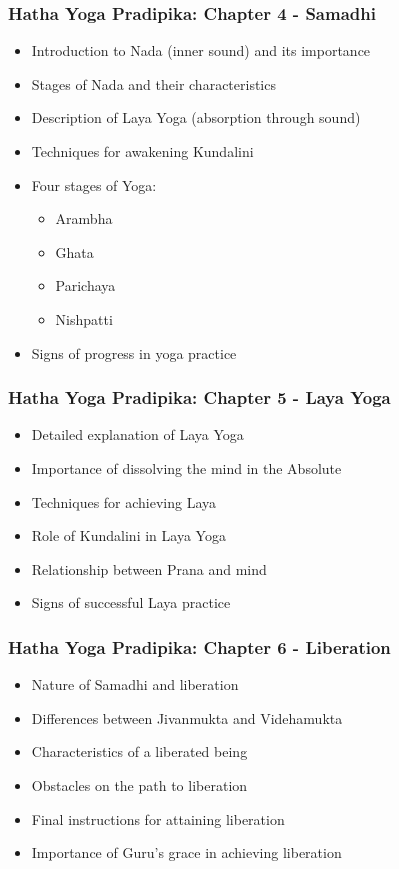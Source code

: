 \begin{frame}[fragile]\frametitle{Hatha Yoga Pradipika: Chapter 4 - Samadhi}
\begin{itemize}
    \item Introduction to Nada (inner sound) and its importance
    \item Stages of Nada and their characteristics
    \item Description of Laya Yoga (absorption through sound)
    \item Techniques for awakening Kundalini
    \item Four stages of Yoga:
    \begin{itemize}
        \item Arambha
        \item Ghata
        \item Parichaya
        \item Nishpatti
    \end{itemize}
    \item Signs of progress in yoga practice
\end{itemize}
\end{frame}

\begin{frame}[fragile]\frametitle{Hatha Yoga Pradipika: Chapter 5 - Laya Yoga}
\begin{itemize}
    \item Detailed explanation of Laya Yoga
    \item Importance of dissolving the mind in the Absolute
    \item Techniques for achieving Laya
    \item Role of Kundalini in Laya Yoga
    \item Relationship between Prana and mind
    \item Signs of successful Laya practice
\end{itemize}
\end{frame}

\begin{frame}[fragile]\frametitle{Hatha Yoga Pradipika: Chapter 6 - Liberation}
\begin{itemize}
    \item Nature of Samadhi and liberation
    \item Differences between Jivanmukta and Videhamukta
    \item Characteristics of a liberated being
    \item Obstacles on the path to liberation
    \item Final instructions for attaining liberation
    \item Importance of Guru's grace in achieving liberation
\end{itemize}
\end{frame}

